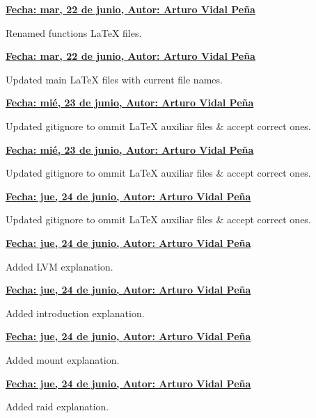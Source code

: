 \item \textbf{\underline{\underline{Fecha:} mar, 22 de junio, \underline{Autor:} Arturo Vidal Peña}}\\\item[] Renamed functions LaTeX files.\\
\item \textbf{\underline{\underline{Fecha:} mar, 22 de junio, \underline{Autor:} Arturo Vidal Peña}}\\\item[] Updated main LaTeX files with current file names.\\
\item \textbf{\underline{\underline{Fecha:} mié, 23 de junio, \underline{Autor:} Arturo Vidal Peña}}\\\item[] Updated gitignore to ommit LaTeX auxiliar files \& accept correct ones.\\
\item \textbf{\underline{\underline{Fecha:} mié, 23 de junio, \underline{Autor:} Arturo Vidal Peña}}\\\item[] Updated gitignore to ommit LaTeX auxiliar files \& accept correct ones.\\
\item \textbf{\underline{\underline{Fecha:} jue, 24 de junio, \underline{Autor:} Arturo Vidal Peña}}\\\item[] Updated gitignore to ommit LaTeX auxiliar files \& accept correct ones.\\
\item \textbf{\underline{\underline{Fecha:} jue, 24 de junio, \underline{Autor:} Arturo Vidal Peña}}\\\item[] Added LVM explanation.\\
\item \textbf{\underline{\underline{Fecha:} jue, 24 de junio, \underline{Autor:} Arturo Vidal Peña}}\\\item[] Added introduction explanation.\\
\item \textbf{\underline{\underline{Fecha:} jue, 24 de junio, \underline{Autor:} Arturo Vidal Peña}}\\\item[] Added mount explanation.\\
\item \textbf{\underline{\underline{Fecha:} jue, 24 de junio, \underline{Autor:} Arturo Vidal Peña}}\\\item[] Added raid explanation.\\
